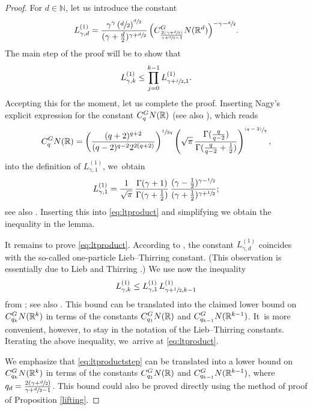 \documentclass[11pt]{article}
\let\oldsfrac\sfrac
\renewcommand{\sfrac}[2]{{\oldsfrac{#1}{#2}}}
\newcommand{\psfrac}[2]{{\sfrac{(#1)}{#2}}}
\newcommand{\GN}{\textup{GN}}
\theoremstyle{definition}
\newcommand{\1}{\mathbbm{1}}
\newcommand{\N}{\mathbb{N}}
\newcommand{\R}{\mathbb{R}}
\numberwithin{equation}{section}
\begin{document}
\begin{proof}
For $d\in\N$, let us introduce the constant
\[
L_{\gamma,d}^{(1)} = \frac{\gamma^\gamma \left(\sfrac d2\right)^\sfrac d2}{(\gamma+\frac d2)^{\gamma+\sfrac d2}} \,\Bigl(C_\frac{2(\gamma+\sfrac d2)}{\gamma+\sfrac d2-1}^\GN(\R^d)\Bigr)^{-\gamma-\sfrac d2}.
\]
The main step of the proof will be to show that
\begin{equation}
\label{eq:ltproduct}
L_{\gamma,k}^{(1)} \leq \prod_{j=0}^{k-1} L_{\gamma+\sfrac j2,1}^{(1)}.
\end{equation}
Accepting this for the moment, let us complete the proof. Inserting Nagy's explicit expression for the constant $C_q^\GN(\R)$ \cite{Na} (see also \cite[Th.\,2.48]{FLW}), which reads
\begin{equation}\label{eq:Nag}
C_{q}^\GN(\R) = \left(\frac{(q+2)^{q+2}}{(q-2)^{q-2}2^{2(q+2)}}\right)^\sfrac{1}{2q} \left(\sqrt\pi \,\frac{\Gamma(\frac{q}{q-2})}{\Gamma(\frac{q}{q-2}+\frac12)}\right)^\psfrac{q-2}{q},
\end{equation}
into the definition of $L_{\gamma,1}^{(1)}$, we~obtain
\[
L_{\gamma,1}^{(1)} = \frac{1}{\sqrt\pi}\,\frac{\Gamma(\gamma+1)}{\Gamma(\gamma+\frac12)}\,\frac{(\gamma-\frac12)^{\gamma-\sfrac12}}{(\gamma+\frac12)^{\gamma+\sfrac12}};
\]
see also \cite[Cor.\,5.4]{FLW}. Inserting this into \eqref{eq:ltproduct} and simplifying we obtain the inequality in the lemma.

It remains to prove \eqref{eq:ltproduct}. According to \cite[Prop.\,5.3]{FLW}, the constant $L_{\gamma,d}^{(1)}$ coincides with the so-called one-particle Lieb--Thirring constant. (This observation is essentially due to Lieb and Thirring \cite{LiTh}.) We use now the inequality
\begin{equation}
\label{eq:ltproductstep}
L_{\gamma,k}^{(1)} \leq L_{\gamma,1}^{(1)} \,L_{\gamma+\sfrac12,k-1}^{(1)}
\end{equation}
from \cite{FGL}; see also \cite[Prop.\,5.14]{FLW}. This bound can be translated into the claimed lower bound on $C_{q_k}^\GN(\R^k)$ in terms of the constants $C_{q_1}^\GN(\R)$ and $C_{q_{k-1}}^\GN(\R^{k-1})$. It~is more convenient, however, to stay in the notation of the Lieb--Thirring constants. Iterating the above inequality, we~arrive at \eqref{eq:ltproduct}.

We emphasize that \eqref{eq:ltproductstep} can be translated into a lower bound on $C_{q_k}^\GN(\R^k)$ in terms of the constants $C_{q_1}^\GN(\R)$ and $C_{q_{k-1}}^\GN(\R^{k-1})$, where $q_d=\frac{2(\gamma+\sfrac d2)}{\gamma+\sfrac d2-1}$. This bound could also be proved directly using the method of proof of Proposition \ref{lifting}.
\end{proof}
\end{document}
